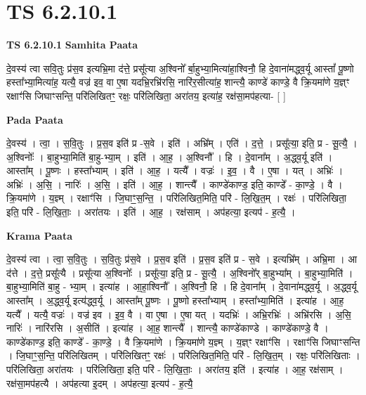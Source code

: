 \documentclass[17pt]{extarticle}
\begin{document}
\section{ TS 6.2.10.1 }

\textbf{TS 6.2.10.1 } \newline
\textbf{Samhita Paata} \newline

दे॒वस्य॑ त्वा सवि॒तुः प्र॑स॒व इत्यभ्रि॒मा द॑त्ते॒ प्रसू᳚त्या अ॒श्विनो᳚ र्बा॒हुभ्या॒मित्या॑हा॒श्विनौ॒ हि दे॒वाना॑मद्ध्व॒र्यू आस्तां᳚ पू॒ष्णो हस्ता᳚भ्या॒मित्या॑ह॒ यत्यै॒ वज्र॑ इव॒ वा ए॒षा यदभ्रि॒रभ्रि॑रसि॒ नारि॑र॒सीत्या॑ह॒ शान्त्यै॒ काण्डे॑ काण्डे॒ वै क्रि॒यमा॑णे य॒ज्ञ्ꣳ रक्षाꣳ॑सि जिघाꣳसन्ति॒ परि॑लिखितꣳ॒॒ रक्षः॒ परि॑लिखिता॒ अरा॑तय॒ इत्या॑ह॒ रक्ष॑सा॒मप॑हत्या- [  ] \newline

\textbf{Pada Paata} \newline

दे॒वस्य॑ । त्वा॒ । स॒वि॒तुः । प्र॒स॒व इति॑ प्र -स॒वे । इति॑ । अभ्रि᳚म् । एति॑ । द॒त्ते॒ । प्रसू᳚त्या॒ इति॒ प्र - सू॒त्यै॒ । अ॒श्विनोः᳚ । बा॒हुभ्या॒मिति॑ बा॒हु-भ्या॒म् । इति॑ । आ॒ह॒ । अ॒श्विनौ᳚ । हि । दे॒वाना᳚म् । अ॒द्ध्व॒र्यू इति॑ । आस्ता᳚म् । पू॒ष्णः । हस्ता᳚भ्याम् । इति॑ । आ॒ह॒ । यत्यै᳚ । वज्रः॑ । इ॒व॒ । वै । ए॒षा । यत् । अभ्रिः॑ । अभ्रिः॑ । अ॒सि॒ । नारिः॑ । अ॒सि॒ । इति॑ । आ॒ह॒ । शान्त्यै᳚ । काण्डे॑काण्ड॒ इति॒ काण्डे᳚ - का॒ण्डे॒ । वै । क्रि॒यमा॑णे । य॒ज्ञ्म् । रक्षाꣳ॑सि । जि॒घाꣳ॒॒स॒न्ति॒ । परि॑लिखित॒मिति॒ परि॑ - लि॒खि॒त॒म् । रक्षः॑ । परि॑लिखिता॒ इति॒ परि॑ - लि॒खि॒ताः॒ । अरा॑तयः । इति॑ । आ॒ह॒ । रक्ष॑साम् । अप॑हत्या॒ इत्यप॑ - ह॒त्यै॒ ।  \newline


\textbf{Krama Paata} \newline

दे॒वस्य॑ त्वा । त्वा॒ स॒वि॒तुः । स॒वि॒तुः प्र॑स॒वे । प्र॒स॒व इति॑ । प्र॒स॒व इति॑ प्र - स॒वे । इत्यभ्रि᳚म् । अभ्रि॒मा । आ द॑त्ते । द॒त्ते॒ प्रसू᳚त्यै । प्रसू᳚त्या अ॒श्विनोः᳚ । प्रसू᳚त्या॒ इति॒ प्र - सू॒त्यै॒ । अ॒श्विनो᳚र् बा॒हुभ्या᳚म् । बा॒हुभ्या॒मिति॑ । बा॒हुभ्या॒मिति॑ बा॒हु - भ्या॒म् । इत्या॑ह । आ॒हा॒श्विनौ᳚ । अ॒श्विनौ॒ हि । हि दे॒वाना᳚म् । दे॒वाना॑मद्ध्व॒र्यू । अ॒द्ध्व॒र्यू आस्ता᳚म् । अ॒द्ध्व॒र्यू इत्य॑द्ध्व॒र्यू । आस्ता᳚म् पू॒ष्णः । पू॒ष्णो हस्ता᳚भ्याम् । हस्ता᳚भ्या॒मिति॑ । इत्या॑ह । आ॒ह॒ यत्यै᳚ । यत्यै॒ वज्रः॑ । वज्र॑ इव । इ॒व॒ वै । वा ए॒षा । ए॒षा यत् । यदभ्रिः॑ । अभ्रि॒रभ्रिः॑ । अभ्रि॑रसि । अ॒सि॒ नारिः॑ । नारि॑रसि । अ॒सीति॑ । इत्या॑ह । आ॒ह॒ शान्त्यै᳚ । शान्त्यै॒ काण्डे॑काण्डे । काण्डे॑काण्डे॒ वै । काण्डे॑काण्ड॒ इति॒ काण्डे᳚ - का॒ण्डे॒ । वै क्रि॒यमा॑णे । क्रि॒यमा॑णे य॒ज्ञ्म् । य॒ज्ञ्ꣳ रक्षाꣳ॑सि । रक्षाꣳ॑सि जिघाꣳसन्ति । जि॒घाꣳ॒॒स॒न्ति॒ परि॑लिखितम् । परि॑लिखितꣳ॒॒ रक्षः॑ । परि॑लिखित॒मिति॒ परि॑ - लि॒खि॒त॒म् । रक्षः॒ परि॑लिखिताः । परि॑लिखिता॒ अरा॑तयः । परि॑लिखिता॒ इति॒ परि॑ - लि॒खि॒ताः॒ । अरा॑तय॒ इति॑ । इत्या॑ह । आ॒ह॒ रक्ष॑साम् । रक्ष॑सा॒मप॑हत्यै । अप॑हत्या इ॒दम् । अप॑हत्या॒ इत्यप॑ - ह॒त्यै॒ \newline
\end{document}
